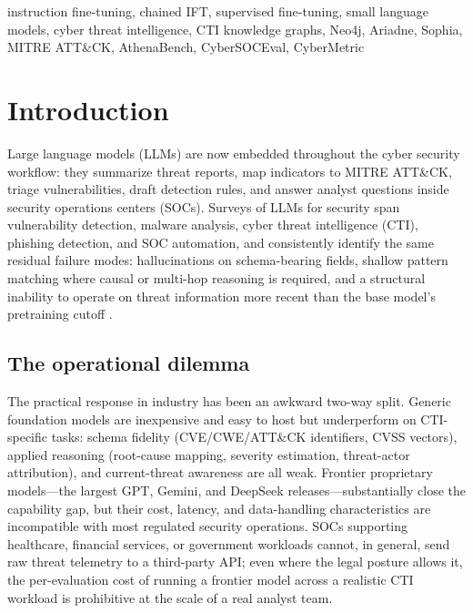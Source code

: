 \documentclass[conference]{IEEEtran}
\begin{document}
\begin{IEEEkeywords}
instruction fine-tuning, chained IFT, supervised fine-tuning, small language models, cyber threat intelligence, CTI knowledge graphs, Neo4j, Ariadne, Sophia, MITRE ATT\&CK, AthenaBench, CyberSOCEval, CyberMetric
\end{IEEEkeywords}

\section{Introduction}

Large language models (LLMs) are now embedded throughout the cyber security workflow: they summarize threat reports, map indicators to MITRE ATT\&CK, triage vulnerabilities, draft detection rules, and answer analyst questions inside security operations centers (SOCs). Surveys of LLMs for security span vulnerability detection, malware analysis, cyber threat intelligence (CTI), phishing detection, and SOC automation, and consistently identify the same residual failure modes: hallucinations on schema-bearing fields, shallow pattern matching where causal or multi-hop reasoning is required, and a structural inability to operate on threat information more recent than the base model's pretraining cutoff \cite{levi2024cyberpal,liu2024cyberbench}.

\subsection{The operational dilemma}
\label{sec:intro-the-operational-dilemma}
The practical response in industry has been an awkward two-way split. Generic foundation models are inexpensive and easy to host but underperform on CTI-specific tasks: schema fidelity (CVE/CWE/ATT\&CK identifiers, CVSS vectors), applied reasoning (root-cause mapping, severity estimation, threat-actor attribution), and current-threat awareness are all weak. Frontier proprietary models---the largest GPT, Gemini, and DeepSeek releases---substantially close the capability gap, but their cost, latency, and data-handling characteristics are incompatible with most regulated security operations. SOCs supporting healthcare, financial services, or government workloads cannot, in general, send raw threat telemetry to a third-party API; even where the legal posture allows it, the per-evaluation cost of running a frontier model across a realistic CTI workload is prohibitive at the scale of a real analyst team.
\end{document}
